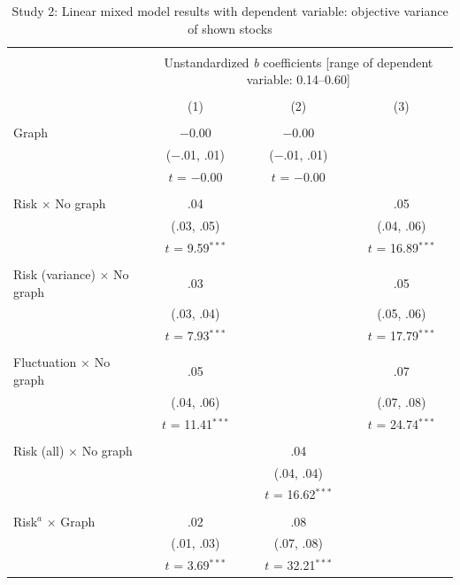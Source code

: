 \begin{table}[!htbp] \centering \small
 \caption{Study 2: Linear mixed model results with dependent variable: objective variance of shown stocks} 
 \label{table:supplement_tab1} 
\begin{tabular}{@{\extracolsep{5pt}}lccc} 
\\[-1.8ex]\hline 
\hline \\[-1.8ex] 
 & \multicolumn{3}{c}{Unstandardized \textit{b} coefficients [range of dependent variable: 0.14--0.60]} \\ 
\cline{2-4} 
\\[-1.8ex] & (1) & (2) & (3)\\ 
\hline \\[-1.8ex] 
 Graph & $-$0.00 & $-$0.00 & \\ 
 & ($-$.01, .01) & ($-$.01, .01) & \\ 
 & $t$ = $-$0.00 & $t$ = $-$0.00 & \\ 
 & & & \\ \midrule
 Risk $\times$ No graph & .04 & & .05 \\ 
 & (.03, .05) & & (.04, .06) \\ 
 & $t$ = 9.59$^{***}$ & & $t$ = 16.89$^{***}$ \\ 
 & & & \\ 
 Risk (variance) $\times$ No graph & .03 & & .05 \\ 
 & (.03, .04) & & (.05, .06) \\ 
 & $t$ = 7.93$^{***}$ & & $t$ = 17.79$^{***}$ \\ 
 & & & \\ 
 Fluctuation $\times$ No graph & .05 & & .07 \\ 
 & (.04, .06) & & (.07, .08) \\ 
 & $t$ = 11.41$^{***}$ & & $t$ = 24.74$^{***}$ \\ 
 & & & \\ 
 Risk (all) $\times$ No graph & & .04 & \\ 
 & & (.04, .04) & \\ 
 & & $t$ = 16.62$^{***}$ & \\ 
 & & & \\ \midrule
 Risk$^{a}$ $\times$  Graph & .02 & .08 & \\ 
 & (.01, .03) & (.07, .08) & \\ 
 & $t$ = 3.69$^{***}$ & $t$ = 32.21$^{***}$ & \\ 

\end{tabular}
\end{table}
